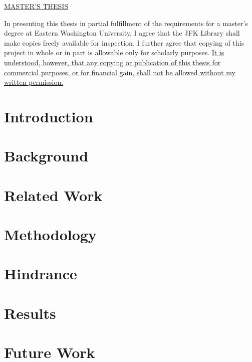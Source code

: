 \documentclass[chapterprefix=false, 12pt]{scrreprt}
\begin{document}
\newpage
\vspace*{1.5in}
\begin{center}
\underline{MASTER'S THESIS}\\
\end{center}
\begin{justify}
In presenting this thesis in partial fulfillment of the requirements for a master’s degree
at Eastern Washington University, I agree that the JFK Library shall make copies freely
available for inspection. I further agree that copying of this project in whole or in part
is allowable only for scholarly purposes. \ul{It is understood, however, that any copying or publication of this thesis for commercial purposes, or for financial gain, shall not be allowed without my written permission.}
\end{justify}
\begin{center}
\end{center}
\singlespace



\newpage


\tableofcontents
\listoffigures
\listoftables
\newpage



\chapter{Introduction}


\chapter{Background}


\chapter{Related Work}


\chapter{Methodology}


\chapter{Hindrance}


\chapter{Results}


\chapter{Future Work}







\newpage

\end{document}
